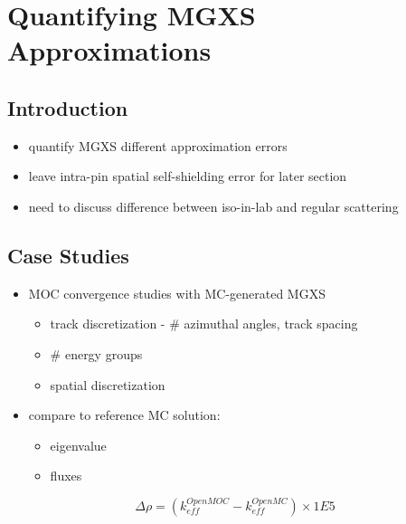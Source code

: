 \chapter{Quantifying MGXS Approximations}
\label{chap:biases}

\section{Introduction}
\label{sec:chap4-intro}

\begin{itemize}[noitemsep]
  \item quantify \ac{MGXS} different approximation errors
  \item leave intra-pin spatial self-shielding error for later section
  \item need to discuss difference between iso-in-lab and regular scattering
\end{itemize}


\section{Case Studies}
\label{sec:chap4-case-studies}

\begin{itemize}[noitemsep]
  \item \ac{MOC} convergence studies with \ac{MC}-generated \ac{MGXS}
  \begin{itemize}[noitemsep]
    \item track discretization - \# azimuthal angles,  track spacing
    \item \# energy groups
    \item spatial discretization
  \end{itemize}
  \item compare to reference \ac{MC} solution:
  \begin{itemize}
    \item eigenvalue
    \item fluxes
  \end{itemize}
\end{itemize}

\begin{equation}
\label{eqn:chap4-delta-rho}
\Delta\rho = \left(k_{eff}^{OpenMOC} - k_{eff}^{OpenMC}\right) \times 1E5
\end{equation}

